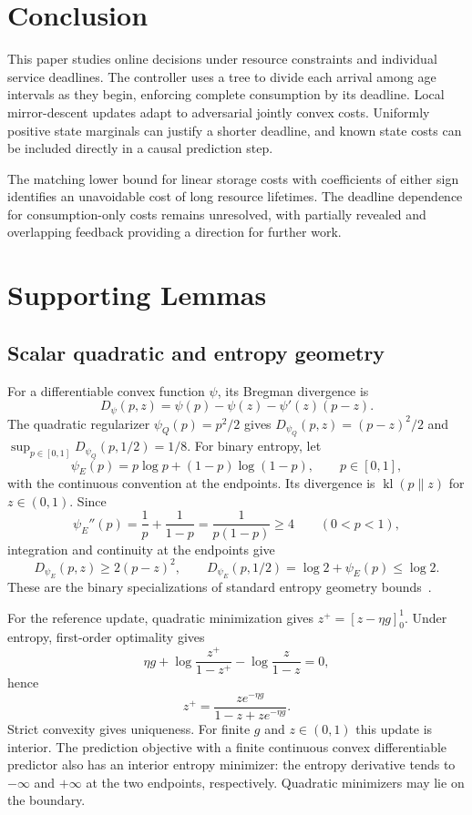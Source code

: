 \documentclass[11pt]{article}
\theoremstyle{plain}
\theoremstyle{remark}
\numberwithin{equation}{section}
\begin{document}
\section{Conclusion}
\label{ch6:sec:conclusion}

This paper studies online decisions under resource constraints and
individual service deadlines. The controller uses a tree to
divide each arrival among age intervals as they begin, enforcing complete
consumption by its deadline. Local mirror-descent updates
adapt to adversarial jointly convex costs. Uniformly positive state marginals
can justify a shorter deadline, and known
state costs can be included directly in a causal prediction step.

The matching lower bound for linear storage costs with coefficients of either sign identifies an unavoidable cost of
long resource lifetimes. The deadline dependence for consumption-only costs remains
unresolved, with partially revealed and overlapping feedback providing a
direction for further work.

\appendix
\section{Supporting Lemmas}

\subsection{Scalar quadratic and entropy geometry}
\label{app:geometry}

For a differentiable convex function $\psi$, its Bregman divergence is
\[
 D_\psi(p,z)=\psi(p)-\psi(z)-\psi'(z)(p-z).
\]
The quadratic regularizer $\psi_Q(p)=p^2/2$ gives
$D_{\psi_Q}(p,z)=(p-z)^2/2$ and
$\sup_{p\in[0,1]}D_{\psi_Q}(p,1/2)=1/8$.
For binary entropy, let
\[
 \psi_E(p)=p\log p+(1-p)\log(1-p),\qquad p\in[0,1],
\]
with the continuous convention at the endpoints. Its divergence is
$\operatorname{kl}(p\|z)$ for $z\in(0,1)$.
Since
\[
 \psi_E''(p)=\frac1p+\frac1{1-p}
 =\frac1{p(1-p)}\ge4\qquad(0<p<1),
\]
integration and continuity at the endpoints give
\[
 D_{\psi_E}(p,z)\ge2(p-z)^2,\qquad
 D_{\psi_E}(p,1/2)=\log2+\psi_E(p)\le\log2.
\]
These are the binary specializations of standard entropy geometry
bounds~\cite{BECK2003167}.

For the reference update, quadratic minimization gives
$z^+=[z-\eta g]_0^1$. Under entropy, first-order optimality gives
\[
 \eta g+\log\frac{z^+}{1-z^+}-\log\frac z{1-z}=0,
\]
hence
\[
 z^+=\frac{z e^{-\eta g}}{1-z+z e^{-\eta g}}.
\]
Strict convexity gives uniqueness. For finite $g$ and $z\in(0,1)$ this
update is interior. The prediction objective with a finite continuous
convex differentiable predictor also has an interior entropy minimizer:
the entropy derivative tends to $-\infty$ and $+\infty$ at the two
endpoints, respectively. Quadratic minimizers may lie on the boundary.
\end{document}
